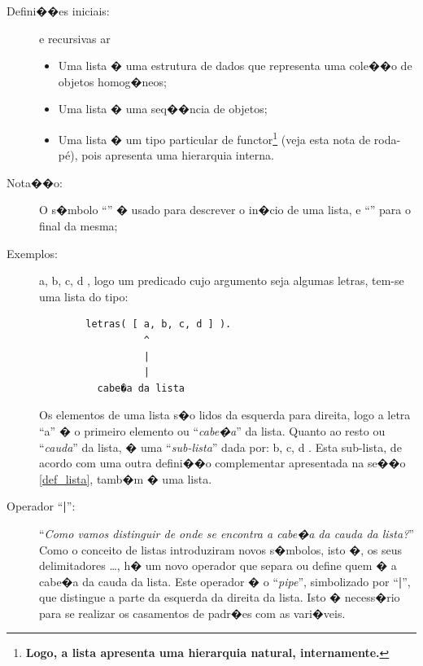 \documentclass[final,a4paper]{article}
\begin{document}
\begin{description}
\item [Defini��es iniciais:] e recursivas
ar
\vskip13pt
\begin{itemize}
\item Uma lista � uma estrutura de dados que representa
uma cole��o de objetos homog�neos;
\item Uma lista � uma seq��ncia de objetos;
\item Uma lista � um  tipo particular de functor\footnote{
{\bf Logo, a lista apresenta uma hierarquia natural,
internamente.}} (veja esta nota de roda-p\'e),
 pois apresenta uma hierarquia interna.
\end{itemize}


\item [Nota��o:] O s�mbolo ``\lbrack'' � usado para descrever o in�cio de uma lista,
e ``\rbrack'' para o final da mesma;

\newpage
\item [Exemplos:] \lbrack a, b, c, d \rbrack,  logo um predicado cujo
argumento seja algumas letras,  tem-se uma lista do tipo:
\begin{verbatim}
        letras( [ a, b, c, d ] ).
                  ^
                  |
                  |
          cabe�a da lista
\end{verbatim}
Os elementos de uma lista s�o lidos da esquerda para direita, logo a letra
 ``a'' � o primeiro elemento ou ``{\em cabe�a}'' da lista. Quanto ao
resto ou ``{\em cauda}'' da lista, � uma   ``{\em sub-lista}''  dada por:
    \lbrack b,  c, d \rbrack.  Esta sub-lista, de acordo com uma outra defini��o complementar apresentada na se��o \ref{def_lista},
tamb�m � uma lista.

\item [Operador ``{\bf |}'':] ``{\em  Como vamos distinguir de onde se encontra
a cabe�a  da cauda da lista?}'' Como o conceito de listas introduziram novos s�mbolos, isto �, os seus delimitadores \lbrack \ldots \rbrack, h� um novo operador que separa ou define quem � a cabe�a da cauda da lista. Este operador � o ``{\em pipe}'', simbolizado por ``{\bf |}'', que distingue a parte da esquerda da direita da lista. Isto � necess�rio para se realizar os casamentos de padr�es com as vari�veis.



\end{description}
\end{document}
